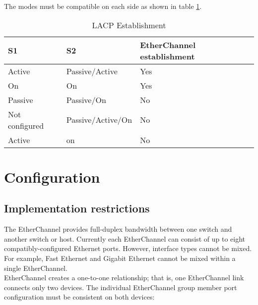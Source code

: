 The modes must be compatible on each side as shown in table \ref{LACP-mode}.
\begin{table}[htbp]
\centering\caption{LACP Establishment}
\label{LACP-mode}
\begin{tabular}{|l|l|l|}
\hline
S1             & S2                & EtherChannel establishment \\ \hline
Active      & Passive/Active    & Yes                        \\ \hline
On             & On                & Yes                        \\ \hline
Passive           & Passive/On           & No                         \\ \hline
Not configured & Passive/Active/On & No                         \\ \hline
Active      & on                & No                         \\ \hline
\end{tabular}
\end{table}

\section{Configuration}

\subsection{Implementation restrictions}

The EtherChannel provides full-duplex bandwidth between one switch and another switch or host. Currently each EtherChannel can consist of up to eight compatibly-configured Ethernet ports. However, interface types cannot be mixed. For example, Fast Ethernet and Gigabit Ethernet cannot be mixed within a single EtherChannel.\\

EtherChannel creates a one-to-one relationship; that is, one EtherChannel link connects only two devices. The individual EtherChannel group member port configuration must be consistent on both devices: 

